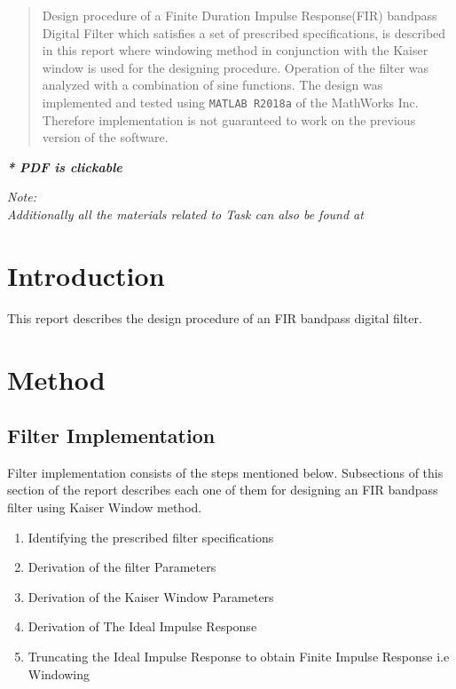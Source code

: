 \documentclass[a4paper,11pt]{article}%
\begin{document}


\begin{abstract}
	Design procedure of a Finite Duration Impulse Response(FIR) bandpass Digital Filter which satisfies a set of prescribed specifications, is described in this report where windowing method in conjunction with the Kaiser window is used for the designing procedure. Operation of the filter was analyzed with a combination of sine functions. The design was implemented and tested using {\tt MATLAB R2018a} of the MathWorks Inc. Therefore implementation is not guaranteed to work on the previous version of the software.
\end{abstract}

\pagebreak
\tableofcontents
\listoffigures
\listoftables
\begin{center}
	\textbf{\textit{* PDF is clickable}}
\end{center}



\textit{Note:}\\
\textit{Additionally all the materials related to Task can also be found at \url{}}
\pagebreak

\section{Introduction}

This report describes the design procedure of an FIR bandpass digital filter.

\section{Method}

\subsection{Filter Implementation}
Filter implementation consists of the steps mentioned below. Subsections of this section of the report describes each one of them for designing an FIR bandpass filter using Kaiser Window method.

\begin{enumerate}[\hspace{1cm}1.]
	\item Identifying the prescribed filter specifications
	\item Derivation of the filter Parameters
	\item Derivation of the Kaiser Window Parameters
	\item Derivation of The Ideal Impulse Response
	\item Truncating the Ideal Impulse Response to obtain Finite Impulse Response i.e Windowing
\end{enumerate}
\end{document}
